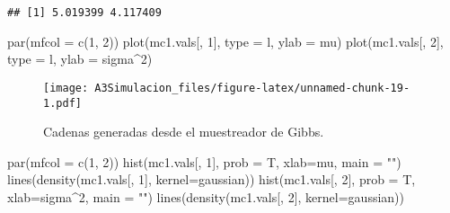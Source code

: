\documentclass[
  12pt,
  spanish,
]{book}
\newenvironment{Shaded}{\begin{snugshade}}{\end{snugshade}}
\newcommand{\AttributeTok}[1]{\textcolor[rgb]{0.77,0.63,0.00}{#1}}
\newcommand{\DecValTok}[1]{\textcolor[rgb]{0.00,0.00,0.81}{#1}}
\newcommand{\FunctionTok}[1]{\textcolor[rgb]{0.00,0.00,0.00}{#1}}
\newcommand{\NormalTok}[1]{#1}
\newcommand{\StringTok}[1]{\textcolor[rgb]{0.31,0.60,0.02}{#1}}
\theoremstyle{definition}
\theoremstyle{definition}
\theoremstyle{definition}
\theoremstyle{definition}
\theoremstyle{remark}
\begin{document}
\begin{verbatim}
## [1] 5.019399 4.117409
\end{verbatim}

\begin{Shaded}
\begin{Highlighting}[]
\FunctionTok{par}\NormalTok{(}\AttributeTok{mfcol =} \FunctionTok{c}\NormalTok{(}\DecValTok{1}\NormalTok{, }\DecValTok{2}\NormalTok{))}
\FunctionTok{plot}\NormalTok{(mc1.vals[, }\DecValTok{1}\NormalTok{], }\AttributeTok{type =} \StringTok{\textquotesingle{}l\textquotesingle{}}\NormalTok{, }\AttributeTok{ylab =} \StringTok{\textquotesingle{}mu\textquotesingle{}}\NormalTok{)}
\FunctionTok{plot}\NormalTok{(mc1.vals[, }\DecValTok{2}\NormalTok{], }\AttributeTok{type =} \StringTok{\textquotesingle{}l\textquotesingle{}}\NormalTok{, }\AttributeTok{ylab =} \StringTok{\textquotesingle{}sigma\^{}2\textquotesingle{}}\NormalTok{)}
\end{Highlighting}
\end{Shaded}

\begin{figure}
\centering
\texttt{[image: A3Simulacion\_files/figure-latex/unnamed-chunk-19-1.pdf]}
\caption{\label{fig:unnamed-chunk-19}Cadenas generadas desde el muestreador de Gibbs.}
\end{figure}

\begin{Shaded}
\begin{Highlighting}[]
\FunctionTok{par}\NormalTok{(}\AttributeTok{mfcol =} \FunctionTok{c}\NormalTok{(}\DecValTok{1}\NormalTok{, }\DecValTok{2}\NormalTok{))}
\FunctionTok{hist}\NormalTok{(mc1.vals[, }\DecValTok{1}\NormalTok{], }\AttributeTok{prob =}\NormalTok{ T, }\AttributeTok{xlab=}\StringTok{\textquotesingle{}mu\textquotesingle{}}\NormalTok{, }\AttributeTok{main =} \StringTok{""}\NormalTok{)}
\FunctionTok{lines}\NormalTok{(}\FunctionTok{density}\NormalTok{(mc1.vals[, }\DecValTok{1}\NormalTok{], }\AttributeTok{kernel=}\StringTok{\textquotesingle{}gaussian\textquotesingle{}}\NormalTok{))}
\FunctionTok{hist}\NormalTok{(mc1.vals[, }\DecValTok{2}\NormalTok{], }\AttributeTok{prob =}\NormalTok{ T, }\AttributeTok{xlab=}\StringTok{\textquotesingle{}sigma\^{}2\textquotesingle{}}\NormalTok{, }\AttributeTok{main =} \StringTok{""}\NormalTok{)}
\FunctionTok{lines}\NormalTok{(}\FunctionTok{density}\NormalTok{(mc1.vals[, }\DecValTok{2}\NormalTok{], }\AttributeTok{kernel=}\StringTok{\textquotesingle{}gaussian\textquotesingle{}}\NormalTok{))}
\end{Highlighting}
\end{Shaded}
\end{document}
